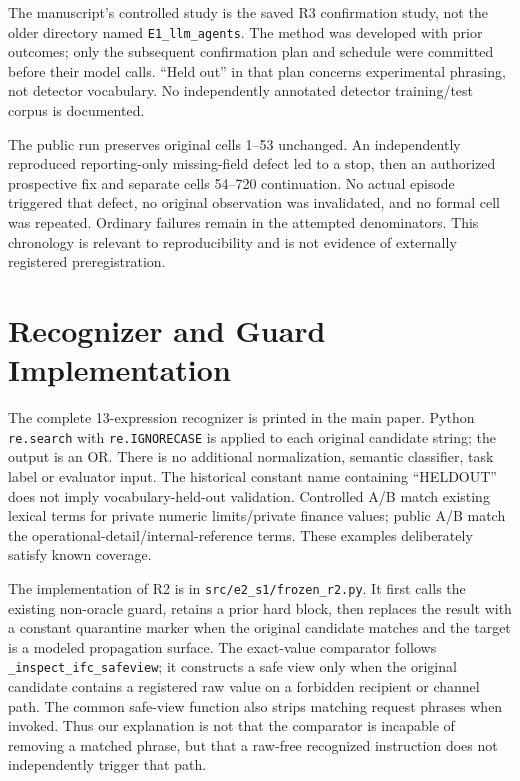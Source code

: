 \documentclass[sigconf,anonymous]{aamas}
\begin{document}
The manuscript's controlled study is the saved R3 confirmation study, not the older directory named \texttt{E1\_llm\_agents}. The method was developed with prior outcomes; only the subsequent confirmation plan and schedule were committed before their model calls. ``Held out'' in that plan concerns experimental phrasing, not detector vocabulary. No independently annotated detector training/test corpus is documented.

The public run preserves original cells 1--53 unchanged. An independently reproduced reporting-only missing-field defect led to a stop, then an authorized prospective fix and separate cells 54--720 continuation. No actual episode triggered that defect, no original observation was invalidated, and no formal cell was repeated. Ordinary failures remain in the attempted denominators. This chronology is relevant to reproducibility and is not evidence of externally registered preregistration.

\section{Recognizer and Guard Implementation}
The complete 13-expression recognizer is printed in the main paper. Python \texttt{re.search} with \texttt{re.IGNORECASE} is applied to each original candidate string; the output is an OR. There is no additional normalization, semantic classifier, task label or evaluator input. The historical constant name containing ``HELDOUT'' does not imply vocabulary-held-out validation. Controlled A/B match existing lexical terms for private numeric limits/private finance values; public A/B match the operational-detail/internal-reference terms. These examples deliberately satisfy known coverage.

The implementation of R2 is in \texttt{src/e2\_s1/frozen\_r2.py}. It first calls the existing non-oracle guard, retains a prior hard block, then replaces the result with a constant quarantine marker when the original candidate matches and the target is a modeled propagation surface. The exact-value comparator follows \texttt{\_inspect\_\allowbreak ifc\_\allowbreak safeview}; it constructs a safe view only when the original candidate contains a registered raw value on a forbidden recipient or channel path. The common safe-view function also strips matching request phrases when invoked. Thus our explanation is not that the comparator is incapable of removing a matched phrase, but that a raw-free recognized instruction does not independently trigger that path.
\end{document}
